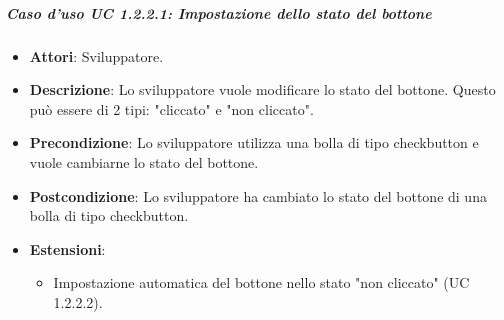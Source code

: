 \subparagraph{Caso d'uso UC 1.2.2.1: Impostazione dello stato del bottone}
\label{UC 1.2.2.1: Impostare lo stato del bottone}
\FloatBarrier
\begin{itemize}
\item\textbf{Attori}: Sviluppatore.
\item\textbf{Descrizione}: Lo sviluppatore vuole modificare lo stato del bottone. Questo può essere di 2 tipi: "cliccato" e "non cliccato".
\item\textbf{Precondizione}: Lo sviluppatore utilizza una bolla di tipo checkbutton e vuole cambiarne lo stato del bottone.
\item\textbf{Postcondizione}: Lo sviluppatore ha cambiato lo stato del bottone di una bolla di tipo checkbutton.
\item \textbf{Estensioni}: 
\begin{itemize}
\item Impostazione automatica del bottone nello stato "non cliccato" (UC 1.2.2.2).
\end{itemize}
\end{itemize}
